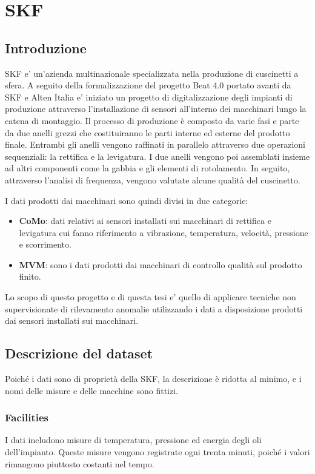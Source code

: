 \chapter{SKF}

\section{Introduzione}
SKF e' un'azienda multinazionale specializzata nella produzione di cuscinetti a sfera. A seguito della formalizzazione del progetto Beat 4.0 portato avanti da SKF e Alten Italia e' iniziato un progetto di digitalizzazione degli impianti di produzione attraverso l'installazione di sensori all'interno dei macchinari lungo la catena di montaggio.
Il processo di produzione è composto da varie fasi e parte da due anelli grezzi che costituiranno le parti interne ed esterne del prodotto finale. Entrambi gli anelli vengono raffinati
in parallelo attraverso due operazioni sequenziali: la rettifica e la levigatura. 
I due anelli vengono poi assemblati insieme ad altri componenti come la gabbia e gli elementi di rotolamento. In seguito, attraverso l'analisi di frequenza, vengono valutate alcune qualità del cuscinetto.

I dati prodotti dai macchinari sono quindi divisi in due categorie: 
\begin{itemize}
  \item \textbf{CoMo}: dati relativi ai sensori installati sui macchinari di rettifica e levigatura cui fanno riferimento a vibrazione, temperatura, velocità, pressione e scorrimento.
  \item \textbf{MVM}: sono i dati prodotti dai macchinari di controllo qualità sul prodotto finito.
\end{itemize}

Lo scopo di questo progetto e di questa tesi e' quello di applicare tecniche non supervisionate di rilevamento anomalie utilizzando i dati a disposizione prodotti dai sensori installati sui macchinari.

\section{Descrizione del dataset}
Poiché i dati sono di proprietà della SKF, la descrizione è ridotta al minimo, e i nomi delle misure e delle macchine sono fittizi.

\subsection{Facilities}
I dati includono misure di temperatura, pressione ed energia degli oli dell'impianto. Queste misure vengono registrate ogni trenta minuti, poiché i valori rimangono piuttosto costanti nel tempo.

